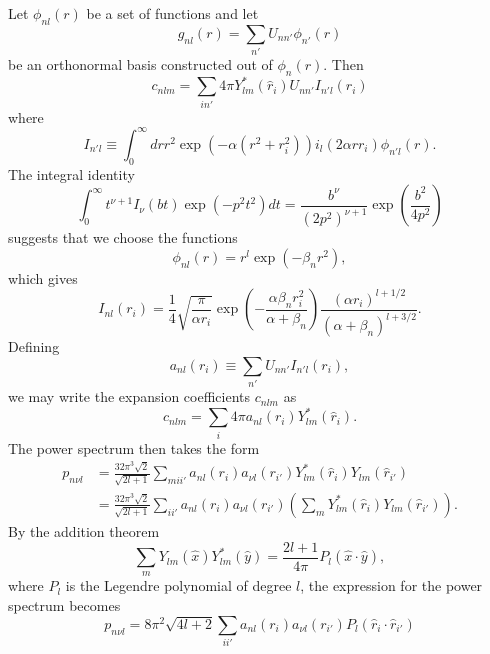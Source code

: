 \documentclass[%
preprint,
amsmath,amssymb,
aps,
]{revtex4-1}
\begin{document}
Let $\phi_{nl}(r)$ be a set of functions and let
\begin{equation}
g_{nl}(r) = \sum_{n'} U_{n n'} \phi_{n'}(r)
\end{equation}
be an orthonormal basis constructed out of $\phi_n(r)$. Then 
\begin{equation}
    c_{nlm} = \sum_{i n'} 4\pi Y^*_{lm}(\hat{r}_i) U_{n n'} I_{n'l}(r_i)
\end{equation}
where
\begin{equation}
    I_{n' l} \equiv \int_0^\infty dr r^2 \exp(-\alpha(r^2 + r_i^2)) i_l(2\alpha r r_i) \phi_{n' l}(r).
\end{equation}
The integral identity \cite{dlmf}
\begin{equation}
\int_0^\infty t^{\nu+1} I_\nu(bt)\exp(-p^2 t^2) dt = \frac{b^\nu}{(2p^2)^{\nu+1}} \exp\left(\frac{b^2}{4p^2}\right)
\end{equation}
suggests that we choose the functions
\begin{equation}
    \phi_{nl}(r) = r^l \exp\left(-\beta_n r^2\right),
\end{equation}
which gives
\begin{equation}
I_{nl}(r_i) = \frac{1}{4} \sqrt{\frac{\pi}{\alpha r_i}} \exp\left(-\frac{ \alpha \beta_n r_i^2}{\alpha + \beta_n}\right) \frac{(\alpha r_i)^{l+1/2}}{(\alpha+\beta_n)^{l+3/2}}.
\end{equation}
Defining
\begin{equation}
a_{nl}(r_i) \equiv \sum_{n'} U_{n n'} I_{n' l}(r_i),
\end{equation}
we may write the expansion coefficients $c_{nlm}$ as
\begin{equation}
c_{nlm} = \sum_i 4\pi a_{nl}(r_i) Y^*_{lm}(\hat{r}_i).
\end{equation}
The power spectrum then takes the form
\begin{equation}
\begin{split}
p_{n\nu l} &= \frac{32 \pi^3 \sqrt{2}}{\sqrt{2l+1}} \sum_{m i i'} a_{nl}(r_i) a_{\nu l}(r_{i'}) Y^*_{lm}(\hat{r}_i) Y_{lm}(\hat{r}_{i'}) \\
&= \frac{32 \pi^3 \sqrt{2}}{\sqrt{2l+1}} \sum_{i i'} a_{nl}(r_i) a_{\nu l}(r_{i'}) \left( \sum_m Y^*_{lm}(\hat{r}_i) Y_{lm}(\hat{r}_{i'}) \right).
\end{split}
\end{equation}
By the addition theorem 
\begin{equation}
\sum_m Y_{lm}(\hat{x}) Y^*_{lm}(\hat{y}) = \frac{2l+1}{4\pi} P_l(\hat{x} \cdot \hat{y}),
\end{equation}
where $P_l$ is the Legendre polynomial of degree $l$, the expression for the power spectrum becomes
\begin{equation}
    \boxed{p_{n\nu l} = 8\pi^2 \sqrt{4l+2} \sum_{i i'} a_{nl}(r_i) a_{\nu l}(r_{i'}) P_l(\hat{r}_i \cdot \hat{r}_{i'})}
\end{equation}
\end{document}
